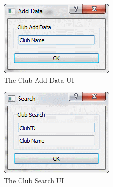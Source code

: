 \begin{figure}
\includegraphics[width=\textwidth]{./Maintenance/UI/ClubAD.png}
\caption{The Club Add Data UI} \label{fig:ClubAD_UI}
\end{figure}

\begin{figure}
\includegraphics[width=\textwidth]{./Maintenance/UI/ClubSearch.png}
\caption{The Club Search UI} \label{fig:ClubSearch_UI}
\end{figure}

